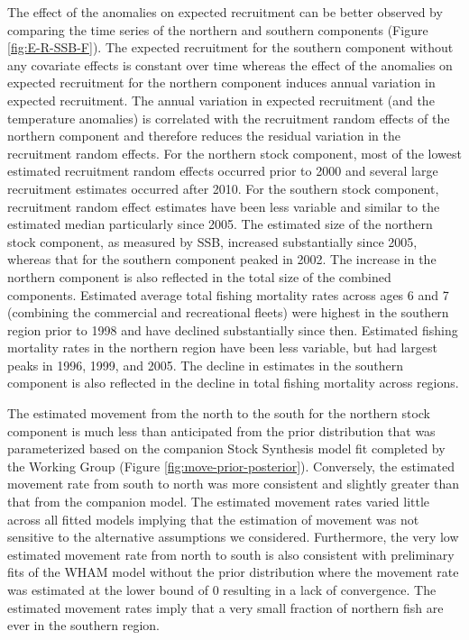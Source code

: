 \documentclass[
]{article}
\begin{document}
The effect of the anomalies on expected recruitment can be better observed by comparing the time series of the northern and southern components (Figure \ref{fig:E-R-SSB-F}). The expected recruitment for the southern component without any covariate effects is constant over time whereas the effect of the anomalies on expected recruitment for the northern component induces annual variation in expected recruitment. The annual variation in expected recruitment (and the temperature anomalies) is correlated with the recruitment random effects of the northern component and therefore reduces the residual variation in the recruitment random effects. For the northern stock component, most of the lowest estimated recruitment random effects occurred prior to 2000 and several large recruitment estimates occurred after 2010. For the southern stock component, recruitment random effect estimates have been less variable and similar to the estimated median particularly since 2005. The estimated size of the northern stock component, as measured by SSB, increased substantially since 2005, whereas that for the southern component peaked in 2002. The increase in the northern component is also reflected in the total size of the combined components. Estimated average total fishing mortality rates across ages 6 and 7 (combining the commercial and recreational fleets) were highest in the southern region prior to 1998 and have declined substantially since then. Estimated fishing mortality rates in the northern region have been less variable, but had largest peaks in 1996, 1999, and 2005. The decline in estimates in the southern component is also reflected in the decline in total fishing mortality across regions.

The estimated movement from the north to the south for the northern stock component is much less than anticipated from the prior distribution that was parameterized based on the companion Stock Synthesis model fit completed by the Working Group (Figure \ref{fig:move-prior-posterior}). Conversely, the estimated movement rate from south to north was more consistent and slightly greater than that from the companion model. The estimated movement rates varied little across all fitted models implying that the estimation of movement was not sensitive to the alternative assumptions we considered. Furthermore, the very low estimated movement rate from north to south is also consistent with preliminary fits of the WHAM model without the prior distribution where the movement rate was estimated at the lower bound of 0 resulting in a lack of convergence. The estimated movement rates imply that a very small fraction of northern fish are ever in the southern region.
\end{document}

